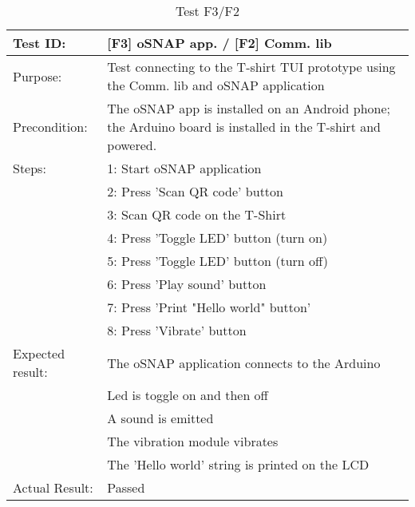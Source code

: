 \begin{table}[h!]
\begin{tabular}{|l|p{10cm}|}
\hline Test ID: &		[F3] oSNAP app. / [F2] Comm. lib \\
\hline Purpose: &		Test connecting to the T-shirt TUI prototype using the
						Comm. lib and oSNAP application \\
\hline Precondition: &	The oSNAP app is installed on an Android phone; the
						Arduino board is installed in the T-shirt and powered. \\
\hline
Steps:
 & 1: Start oSNAP application \\
 & 2: Press 'Scan QR code' button \\
 & 3: Scan QR code on the T-Shirt \\
 & 4: Press 'Toggle LED' button (turn on) \\
 & 5: Press 'Toggle LED' button (turn off) \\
 & 6: Press 'Play sound' button \\
 & 7: Press 'Print "Hello world" button' \\
 & 8: Press 'Vibrate' button \\
\hline
Expected result:
 & The oSNAP application connects to the Arduino \\
 & Led is toggle on and then off \\
 & A sound is emitted \\
 & The vibration module vibrates \\
 & The 'Hello world' string is printed on the LCD \\
\hline
Actual Result:
 & Passed \\
\hline
\end{tabular}
\caption{Test F3/F2}
\end{table}


